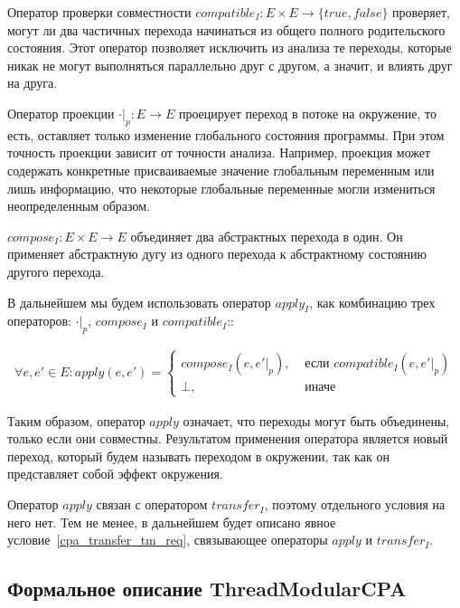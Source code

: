 Оператор проверки совместности $compatible_I: E \times E \rightarrow \{true, false\}$ проверяет, могут ли два частичных перехода начинаться из общего полного родительского состояния. 
Этот оператор позволяет исключить из анализа те переходы, которые никак не могут выполняться параллельно друг с другом, а значит, и влиять друг на друга.

Оператор проекции $\cdot|_p: E \rightarrow E$ проецирует переход в потоке на окружение, то есть, оставляет только изменение глобального состояния программы. 
При этом точность проекции зависит от точности анализа.
Например, проекция может содержать конкретные присваиваемые значение глобальным переменным или лишь информацию, что некоторые глобальные переменные могли измениться неопределенным образом. 

$compose_I: E \times E \rightarrow E$ объединяет два абстрактных перехода в один. Он применяет абстрактную дугу из одного перехода к абстрактному состоянию другого перехода. 

В дальнейшем мы будем использовать оператор $apply_I$, как комбинацию трех операторов: $\cdot|_p$, $compose_I$ и $compatible_I$::

\begin{equation}
\label{apply_function}
\begin{aligned}
\forall e, e' \in E: apply(e, e') = 
\begin{cases}
compose_{I}(e, e'|_p), &\mbox{ если } compatible_I(e, e'|_p) \\
\bot, & \mbox{ иначе}
\end{cases}
\end{aligned}
\end{equation}

Таким образом, оператор $apply$ означает, что переходы могут быть объединены, только если они совместны. Результатом применения оператора является новый переход, который будем называть переходом в окружении, так как он представляет собой эффект окружения.

Оператор $apply$ связан с оператором $transfer_I$, поэтому отдельного условия на него нет.
Тем не менее, в дальнейшем будет описано явное условие~\ref{cpa_transfer_tm_req}, связывающее операторы $apply$ и $transfer_I$.


\subsection{Формальное описание ThreadModularCPA}

